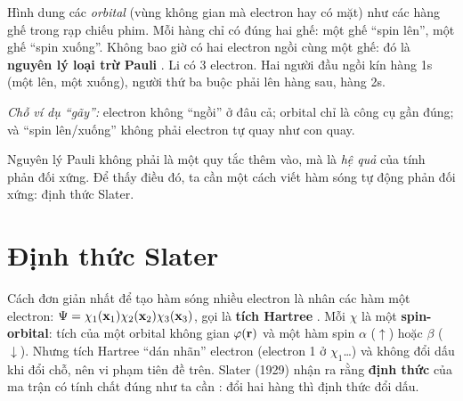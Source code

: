 \begin{eli5}
Hình dung các \emph{orbital} (vùng không gian mà electron hay có mặt) như các hàng ghế trong rạp chiếu phim. Mỗi hàng chỉ có đúng hai ghế: một ghế ``spin lên'', một ghế ``spin xuống''. Không bao giờ có hai electron ngồi cùng một ghế: đó là \textbf{nguyên lý loại trừ Pauli} \cite{Pauli1925}. Li có 3 electron. Hai người đầu ngồi kín hàng 1s (một lên, một xuống), người thứ ba buộc phải lên hàng sau, hàng 2s.

\emph{Chỗ ví dụ ``gãy'':} electron không ``ngồi'' ở đâu cả; orbital chỉ là công cụ gần đúng; và ``spin lên/xuống'' không phải electron tự quay như con quay.
\end{eli5}

Nguyên lý Pauli không phải là một quy tắc thêm vào, mà là \emph{hệ quả} của tính phản đối xứng. Để thấy điều đó, ta cần một cách viết hàm sóng tự động phản đối xứng: định thức Slater.

\section{Định thức Slater}

Cách đơn giản nhất để tạo hàm sóng nhiều electron là nhân các hàm một electron: $\Psi=\chi_1(\mathbf x_1)\chi_2(\mathbf x_2)\chi_3(\mathbf x_3)$, gọi là \textbf{tích Hartree} . Mỗi $\chi$ là một \textbf{spin-orbital}: tích của một orbital không gian $\varphi(\mathbf r)$ và một hàm spin $\alpha$ ($\uparrow$) hoặc $\beta$ ($\downarrow$). Nhưng tích Hartree ``dán nhãn'' electron (electron 1 ở $\chi_1$\ldots) và không đổi dấu khi đổi chỗ, nên vi phạm tiên đề trên. Slater (1929) nhận ra rằng \textbf{định thức} của ma trận có tính chất đúng như ta cần \cite{Slater1929}: đổi hai hàng thì định thức đổi dấu.

